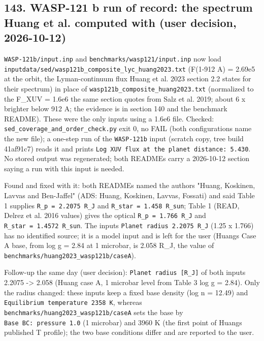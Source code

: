 \documentclass[english,a4paper]{my_memo}
\begin{document}
\subsection{143. WASP-121 b run of record: the spectrum Huang et al. computed with (user decision, 2026-10-12)}\label{143-wasp-121-b-run-of-record-the-spectrum-huang-et-al-computed-with-user-decision-2026-10-12}

\texttt{WASP-121b/input.inp} and \texttt{benchmarks/wasp121/input.inp} now load \texttt{inputdata/sed/wasp121b\_composite\_lyc\_huang2023.txt} (F(1-912 A) = 2.69e5 at the orbit, the Lyman-continuum flux Huang et al. 2023 section 2.2 states for their spectrum) in place of \texttt{wasp121b\_composite\_huang2023.txt} (normalized to the F\_XUV = 1.6e6 the same section quotes from Salz et al. 2019; about 6 x brighter below 912 A; the evidence is in section 140 and the benchmark README). These were the only inputs using a 1.6e6 file. Checked: \texttt{sed\_coverage\_and\_order\_check.py} exit 0, no FAIL (both configurations name the new file); a one-step run of the \texttt{WASP-121b} input (scratch copy, tree build 41af91c7) reads it and prints \texttt{Log\ XUV\ flux\ at\ the\ planet\ distance:\ 5.430}. No stored output was regenerated; both READMEs carry a 2026-10-12 section saying a run with this input is needed.

Found and fixed with it: both READMEs named the authors "Huang, Koskinen, Lavvas and Ben-Jaffel" (ADS: Huang, Koskinen, Lavvas, Fossati) and said Table 1 supplies \texttt{R\_p\ =\ 2.2075\ R\_J} and \texttt{R\_star\ =\ 1.458\ R\_sun}; Table 1 (READ, Delrez et al. 2016 values) gives the optical \texttt{R\_p\ =\ 1.766\ R\_J} and \texttt{R\_star\ =\ 1.4572\ R\_sun}. The input\textquotesingle s \texttt{Planet\ radius\ 2.2075\ R\_J} (1.25 x 1.766) has no identified source; it is a model input and is left for the user (Huang\textquotesingle s Case A base, from log g = 2.84 at 1 microbar, is 2.058 R\_J, the value of \texttt{benchmarks/huang2023\_wasp121b/caseA}).

Follow-up the same day (user decision): \texttt{Planet\ radius\ {[}R\_J{]}} of both inputs 2.2075 -\textgreater{} 2.058 (Huang case A, 1 microbar level from Table 3 log g = 2.84). Only the radius changed: these inputs keep a fixed base density (log n = 12.49) and \texttt{Equilibrium\ temperature\ 2358\ K}, whereas \texttt{benchmarks/huang2023\_wasp121b/caseA} sets the base by \texttt{Base\ BC:\ pressure\ 1.0} (1 microbar) and 3960 K (the first point of Huang\textquotesingle s published T profile); the two base conditions differ and are reported to the user.
\end{document}

